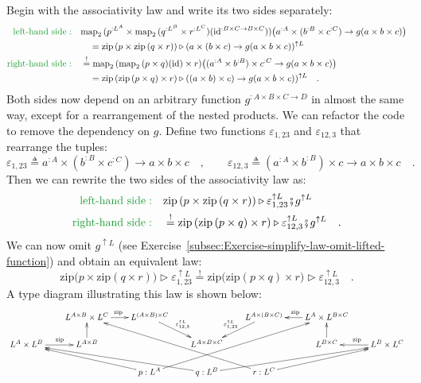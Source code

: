 Begin with the associativity law and write its two sides separately:
\begin{align*}
{\color{greenunder}\text{left-hand side}:}\quad & \text{map}_{2}\,(p^{:L^{A}}\times\text{map}_{2}\,(q^{:L^{B}}\times r^{:L^{C}})(\text{id}^{:B\times C\rightarrow B\times C}))\big(a^{:A}\times(b^{:B}\times c^{:C})\rightarrow g(a\times b\times c)\big)\\
 & \quad=\text{zip}\,(p\times\text{zip}\,(q\times r))\triangleright(a\times(b\times c)\rightarrow g(a\times b\times c))^{\uparrow L}\\
{\color{greenunder}\text{right-hand side}:}\quad & \overset{!}{=}\text{map}_{2}\,(\text{map}_{2}\,(p\times q)(\text{id})\times r)\big((a^{:A}\times b^{:B})\times c^{:C}\rightarrow g(a\times b\times c)\big)\\
 & \quad=\text{zip}\,(\text{zip}\,(p\times q)\times r)\triangleright((a\times b)\times c)\rightarrow g(a\times b\times c))^{\uparrow L}\quad.
\end{align*}
Both sides now depend on an arbitrary function $g^{:A\times B\times C\rightarrow D}$
in almost the same way, except for a rearrangement of the nested products.
We can refactor the code to remove the dependency on $g$. Define
two functions $\varepsilon_{1,23}$ and $\varepsilon_{12,3}$ that
rearrange the tuples:
\[
\varepsilon_{1,23}\triangleq a^{:A}\times(b^{:B}\times c^{:C})\rightarrow a\times b\times c\quad,\quad\quad\varepsilon_{12,3}\triangleq(a^{:A}\times b^{:B})\times c\rightarrow a\times b\times c\quad.
\]
Then we can rewrite the two sides of the associativity law as:
\begin{align*}
{\color{greenunder}\text{left-hand side}:}\quad & \text{zip}\,(p\times\text{zip}\,(q\times r))\triangleright\varepsilon_{1,23}^{\uparrow L}\bef g^{\uparrow L}\\
{\color{greenunder}\text{right-hand side}:}\quad & \overset{!}{=}\text{zip}\,(\text{zip}\,(p\times q)\times r)\triangleright\varepsilon_{12,3}^{\uparrow L}\bef g^{\uparrow L}\quad.
\end{align*}
We can now omit $g^{\uparrow L}$ (see Exercise~\ref{subsec:Exercise-simplify-law-omit-lifted-function})
and obtain an equivalent law:
\begin{equation}
\text{zip}\big(p\times\text{zip}\left(q\times r\right)\big)\triangleright\varepsilon_{1,23}^{\uparrow L}\overset{!}{=}\text{zip}\big(\text{zip}\left(p\times q\right)\times r\big)\triangleright\varepsilon_{12,3}^{\uparrow L}\quad.\label{eq:zip-associativity-law-with-epsilons}
\end{equation}
A type diagram illustrating this law is shown below:
\[
\xymatrix{\xyScaleY{1.4pc}\xyScaleX{1.7pc} & L^{A\times B}\times L^{C}\ar[r]\sp(0.5){\text{zip}} & L^{(A\times B)\times C}\ar[rd]\sp(0.5){\varepsilon_{12,3}^{\uparrow L}} &  & L^{A\times(B\times C)}\ar[ld]\sb(0.5){\varepsilon_{1,23}^{\uparrow L}} & L^{A}\times L^{B\times C}\ar[l]\sb(0.5){\text{zip}}\\
L^{A}\times L^{B}\ar[r]\sp(0.55){\text{zip}} & L^{A\times B}\ar[u] &  & L^{A\times B\times C} &  & L^{B\times C}\ar[u] & L^{B}\times L^{C}\ar[l]\sb(0.5){\text{zip}}\\
 &  & p:L^{A}\ar[llu]\ar[rrruu] & q:L^{B}\ar[lllu]\ar[rrru] & r:L^{C}\ar[rru]\ar[llluu]
}
\]

